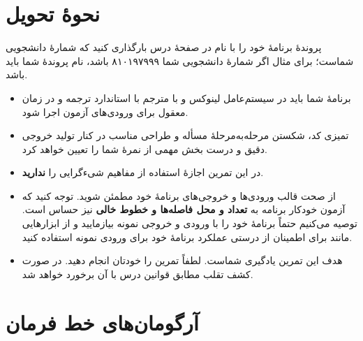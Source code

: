 \documentclass{utap}
\begin{document}
    \begin{latin}
    \begin{figure}
    \centering
    {\fontsize{4.4}{4.4} \selectfont
    }
    \end{figure}
    \end{latin}

    \clearpage
    
    \section{نحوهٔ تحویل}

    پروندهٔ برنامهٔ خود را با نام  در صفحهٔ  درس بارگذاری کنید که  شمارهٔ دانشجویی شماست؛ برای مثال اگر شمارهٔ دانشجویی شما ۸۱۰۱۹۷۹۹۹ باشد، نام پروندهٔ شما باید  باشد.

    \begin{itemize}
        \item برنامهٔ شما باید در سیستم‌عامل لینوکس و با مترجم  با استاندارد  ترجمه و در زمان معقول برای ورودی‌های آزمون اجرا شود.
        \item تمیزی کد، شکستن مرحله‌به‌مرحلهٔ مسأله و طراحی مناسب در کنار تولید خروجی دقیق و درست بخش مهمی از نمرهٔ شما را تعیین خواهد کرد.
        \item در این تمرین اجازهٔ استفاده از مفاهیم شیءگرایی را \textbf{ندارید}.
        \item از صحت قالب ورودی‌ها و خروجی‌های برنامهٔ خود مطمئن شوید. توجه کنید که آزمون خودکار برنامه به \textbf{تعداد و محل فاصله‌ها و خطوط خالی} نیز حساس است. توصیه می‌کنیم حتماً برنامهٔ خود را با ورودی و خروجی نمونه بیازمایید و از ابزارهایی مانند  برای اطمینان از درستی عملکرد برنامهٔ خود برای ورودی نمونه استفاده کنید.
        \item هدف این تمرین یادگیری شماست. لطفاً تمرین را خودتان انجام دهید. در صورت کشف تقلب مطابق قوانین درس با آن برخورد خواهد شد.
    \end{itemize}

    \appendix

    \section[آرگومان‌های خط فرمان]{آرگومان‌های خط فرمان\label{sec:commandline-args}}
\end{document}
